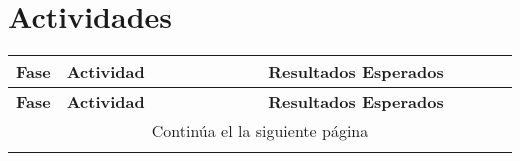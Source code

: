 \section{Actividades}

\small
\begin{longtable}{|p{0.1\linewidth}|m{0.4\linewidth}|p{0.4\linewidth}|p{0.23\linewidth}|}
\hline
\textbf{Fase}  & \textbf{Actividad} & \textbf{Resultados Esperados}\\
\hline
\endfirsthead

\hline
\textbf{Fase}  & \textbf{Actividad} & \textbf{Resultados Esperados} \\
\hline
\endhead

\hline
\multicolumn{4}{|c|}{Contin\'ua el la siguiente p\'agina} \\
\hline
\endfoot
\endlastfoot


\end{longtable}
